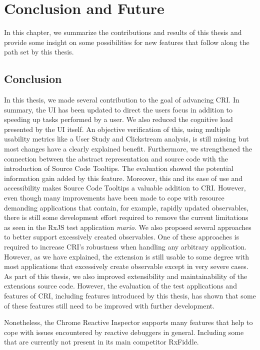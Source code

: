 \chapter{Conclusion and Future}
\label{ch:Future}
In this chapter, we summarize the contributions and results of this thesis and provide some insight on some possibilities for new features that follow along the path set by this thesis.

\section{Conclusion}
In this thesis, we made several contribution to the goal of advancing CRI. In summary, the UI has been updated to direct the users focus in addition to speeding up tasks performed by a user. We also reduced the cognitive load presented by the UI itself. An objective verification of this, using multiple usability metrics like a User Study and Clickstream analysis, is still missing but most changes have a clearly explained benefit. %
 Furthermore, we strengthened the connection between the abstract representation and source code with the introduction of Source Code Tooltips. The evaluation showed the potential information gain added by this feature. Moreover, this and its ease of use and  accessibility makes Source Code Tooltips a valuable addition to CRI. %
However, even though many improvements have been made to cope with resource demanding applications that contain, for example, rapidly updated observables, there is still some development effort required to remove the current limitations as seen in the RxJS test application \emph{mario}. We also proposed several approaches to better support excessively created observables.
One of these approaches is required to increase CRI's robustness when handling any arbitrary application. However, as we have explained, the extension is still usable to some degree with most applications that excessively create observable except in very severe cases.
As part of this thesis, we also improved extensibility and maintainability of the extensions source code. However, the evaluation of the test applications and features of CRI, including features introduced by this thesis, has shown that some of these features still need to be improved with further development.

Nonetheless, the Chrome Reactive Inspector supports many features that help to cope with issues encountered by reactive debuggers in general. Including some that are currently not present in its main competitor RxFiddle.

